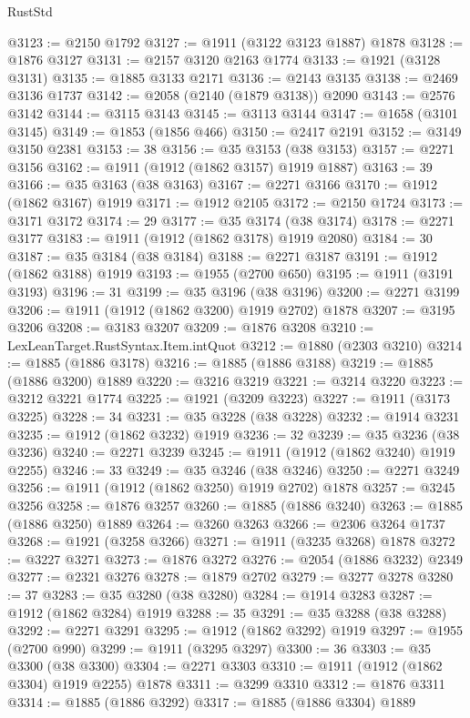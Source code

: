 \begin{lexlean}{RustStd}
\begin{coremodule}
@3123 := @2150 @1792
@3127 := @1911 (@3122 @3123 @1887) @1878
@3128 := @1876 @3127
@3131 := @2157 @3120 @2163 @1774
@3133 := @1921 (@3128 @3131)
@3135 := @1885 @3133 @2171
@3136 := @2143 @3135
@3138 := @2469 @3136 @1737
@3142 := @2058 (@2140 (@1879 @3138)) @2090
@3143 := @2576 @3142
@3144 := @3115 @3143
@3145 := @3113 @3144
@3147 := @1658 (@3101 @3145)
@3149 := @1853 (@1856 @466)
@3150 := @2417 @2191
@3152 := @3149 @3150 @2381
@3153 := 38
@3156 := @35 @3153 (@38 @3153)
@3157 := @2271 @3156
@3162 := @1911 (@1912 (@1862 @3157) @1919 @1887)
@3163 := 39
@3166 := @35 @3163 (@38 @3163)
@3167 := @2271 @3166
@3170 := @1912 (@1862 @3167) @1919
@3171 := @1912 @2105
@3172 := @2150 @1724
@3173 := @3171 @3172
@3174 := 29
@3177 := @35 @3174 (@38 @3174)
@3178 := @2271 @3177
@3183 := @1911 (@1912 (@1862 @3178) @1919 @2080)
@3184 := 30
@3187 := @35 @3184 (@38 @3184)
@3188 := @2271 @3187
@3191 := @1912 (@1862 @3188) @1919
@3193 := @1955 (@2700 @650)
@3195 := @1911 (@3191 @3193)
@3196 := 31
@3199 := @35 @3196 (@38 @3196)
@3200 := @2271 @3199
@3206 := @1911 (@1912 (@1862 @3200) @1919 @2702) @1878
@3207 := @3195 @3206
@3208 := @3183 @3207
@3209 := @1876 @3208
@3210 := LexLeanTarget.RustSyntax.Item.intQuot
@3212 := @1880 (@2303 @3210)
@3214 := @1885 (@1886 @3178)
@3216 := @1885 (@1886 @3188)
@3219 := @1885 (@1886 @3200) @1889
@3220 := @3216 @3219
@3221 := @3214 @3220
@3223 := @3212 @3221 @1774
@3225 := @1921 (@3209 @3223)
@3227 := @1911 (@3173 @3225)
@3228 := 34
@3231 := @35 @3228 (@38 @3228)
@3232 := @1914 @3231
@3235 := @1912 (@1862 @3232) @1919
@3236 := 32
@3239 := @35 @3236 (@38 @3236)
@3240 := @2271 @3239
@3245 := @1911 (@1912 (@1862 @3240) @1919 @2255)
@3246 := 33
@3249 := @35 @3246 (@38 @3246)
@3250 := @2271 @3249
@3256 := @1911 (@1912 (@1862 @3250) @1919 @2702) @1878
@3257 := @3245 @3256
@3258 := @1876 @3257
@3260 := @1885 (@1886 @3240)
@3263 := @1885 (@1886 @3250) @1889
@3264 := @3260 @3263
@3266 := @2306 @3264 @1737
@3268 := @1921 (@3258 @3266)
@3271 := @1911 (@3235 @3268) @1878
@3272 := @3227 @3271
@3273 := @1876 @3272
@3276 := @2054 (@1886 @3232) @2349
@3277 := @2321 @3276
@3278 := @1879 @2702
@3279 := @3277 @3278
@3280 := 37
@3283 := @35 @3280 (@38 @3280)
@3284 := @1914 @3283
@3287 := @1912 (@1862 @3284) @1919
@3288 := 35
@3291 := @35 @3288 (@38 @3288)
@3292 := @2271 @3291
@3295 := @1912 (@1862 @3292) @1919
@3297 := @1955 (@2700 @990)
@3299 := @1911 (@3295 @3297)
@3300 := 36
@3303 := @35 @3300 (@38 @3300)
@3304 := @2271 @3303
@3310 := @1911 (@1912 (@1862 @3304) @1919 @2255) @1878
@3311 := @3299 @3310
@3312 := @1876 @3311
@3314 := @1885 (@1886 @3292)
@3317 := @1885 (@1886 @3304) @1889

\end{coremodule}
\end{lexlean}
